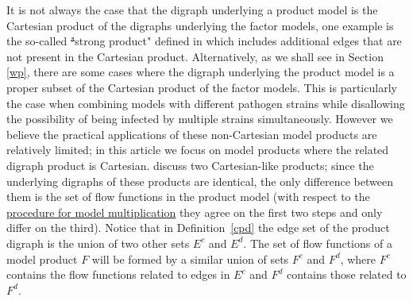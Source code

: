 \documentclass[pdflatex,sn-basic]{sn-jnl}%
\theoremstyle{definition}
\providecommand{\DIFadd}[1]{{\protect\color{blue}\uwave{#1}}} %
\providecommand{\DIFdel}[1]{{\protect\color{red}\sout{#1}}}                      %
\providecommand{\DIFaddbegin}{} %
\providecommand{\DIFaddend}{} %
\providecommand{\DIFdelbegin}{} %
\providecommand{\DIFdelend}{} %
\newcommand{\DIFscaledelfig}{0.5}
\newlength{\DIFdelgraphicswidth} %
\newlength{\DIFdelgraphicsheight} %
\newcommand{\DIFaddincludegraphics}[2][]{{\color{blue}\fbox{\DIFOincludegraphics[#1]{#2}}}} %
\newcommand{\DIFdelincludegraphics}[2][]{%
\sbox{\DIFdelgraphicsbox}{\DIFOincludegraphics[#1]{#2}}%
\settoboxwidth{\DIFdelgraphicswidth}{\DIFdelgraphicsbox} %
\settoboxtotalheight{\DIFdelgraphicsheight}{\DIFdelgraphicsbox} %
\scalebox{\DIFscaledelfig}{%
\parbox[b]{\DIFdelgraphicswidth}{\usebox{\DIFdelgraphicsbox}\\[-\baselineskip] \rule{\DIFdelgraphicswidth}{0em}}\llap{\resizebox{\DIFdelgraphicswidth}{\DIFdelgraphicsheight}{%
\setlength{\unitlength}{\DIFdelgraphicswidth}%
\begin{picture}(1,1)%
\thicklines\linethickness{2pt} %
{\color[rgb]{1,0,0}\put(0,0){\framebox(1,1){}}}%
{\color[rgb]{1,0,0}\put(0,0){\line( 1,1){1}}}%
{\color[rgb]{1,0,0}\put(0,1){\line(1,-1){1}}}%
\end{picture}%
}\hspace*{3pt}}} %
} %
\DeclareRobustCommand{\DIFaddbegin}{\DIFOaddbegin \let\includegraphics\DIFaddincludegraphics} %
\DeclareRobustCommand{\DIFaddend}{\DIFOaddend \let\includegraphics\DIFOincludegraphics} %
\DeclareRobustCommand{\DIFdelbegin}{\DIFOdelbegin \let\includegraphics\DIFdelincludegraphics} %
\DeclareRobustCommand{\DIFdelend}{\DIFOaddend \let\includegraphics\DIFOincludegraphics} %
\begin{document}
It is not always the case that the digraph underlying a product model is the Cartesian product of the digraphs underlying the factor models, one example is the so-called \DIFdelbegin \DIFdel{"}\DIFdelend \DIFaddbegin \DIFadd{“}\DIFaddend strong product" defined in \cite{worden2017products} which includes additional edges that are not present in the Cartesian product. Alternatively, as we shall see in Section \ref{wp}, there are some cases where the digraph underlying the product model is a proper subset of the Cartesian product of the factor models. This is particularly the case when combining models with different pathogen strains while disallowing the possibility of being infected by multiple strains simultaneously. However we believe the practical applications of these non-Cartesian model products are relatively limited; in this article we focus on model products where the related digraph product is Cartesian. \cite{worden2017products} discuss two Cartesian-like products; since the underlying digraphs of these products are identical, the only difference between them is the set of flow functions in the product model (with respect to the \hyperref[genproc]{procedure for model
  multiplication} they agree on the first two steps and only differ on the third). Notice that in Definition~\ref{cpd} the edge set of the product digraph is the union of two other sets $E^c$ and $E^d$. The set of flow functions of a model product $F$ will be formed by a similar union of sets $F^c$ and $F^d$, where $F^c$ contains the flow functions related to edges in $E^c$ and $F^d$ contains those related to $F^d$.
\end{document}
